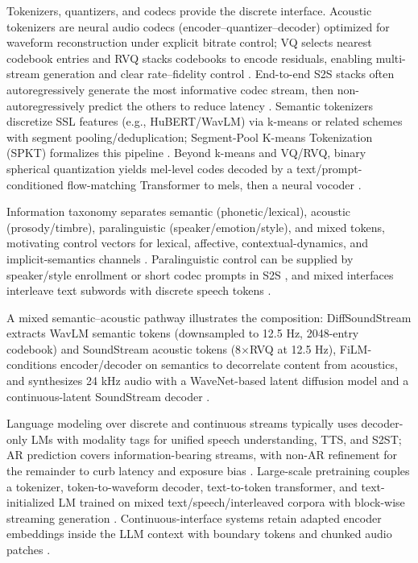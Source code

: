 \documentclass{article}
\begin{document}
Tokenizers, quantizers, and codecs provide the discrete interface. Acoustic tokenizers are neural audio codecs (encoder--quantizer--decoder) optimized for waveform reconstruction under explicit bitrate control; VQ selects nearest codebook entries and RVQ stacks codebooks to encode residuals, enabling multi-stream generation and clear rate--fidelity control \cite{guo2025recentadvancesdiscretespeechtokensreview}. End-to-end S2S stacks often autoregressively generate the most informative codec stream, then non-autoregressively predict the others to reduce latency \cite{peng2024mslms2stmultitaskspeechlanguagemodeltext}. Semantic tokenizers discretize SSL features (e.g., HuBERT/WavLM) via k-means or related schemes with segment pooling/deduplication; Segment-Pool K-means Tokenization (SPKT) formalizes this pipeline \cite{kando2025exploringeffectsegmentationvocabularysiz}. Beyond k-means and VQ/RVQ, binary spherical quantization yields mel-level codes decoded by a text/prompt-conditioned flow-matching Transformer to mels, then a neural vocoder \cite{wang2025tadicodectextawarediffusionspeechtokeniz}.

Information taxonomy separates semantic (phonetic/lexical), acoustic (prosody/timbre), paralinguistic (speaker/emotion/style), and mixed tokens, motivating control vectors for lexical, affective, contextual-dynamics, and implicit-semantics channels \cite{guo2025recentadvancesdiscretespeechtokensreview,wang2025bossbeyondsemanticspeech}. Paralinguistic control can be supplied by speaker/style enrollment or short codec prompts in S2S \cite{wu2024speechcomposerunifyingmultiplespeechtask,peng2024mslms2stmultitaskspeechlanguagemodeltext}, and mixed interfaces interleave text subwords with discrete speech tokens \cite{wu2024speechcomposerunifyingmultiplespeechtask}.

A mixed semantic--acoustic pathway illustrates the composition: DiffSoundStream extracts WavLM semantic tokens (downsampled to 12.5 Hz, 2048-entry codebook) and SoundStream acoustic tokens (8$\times$RVQ at 12.5 Hz), FiLM-conditions encoder/decoder on semantics to decorrelate content from acoustics, and synthesizes 24 kHz audio with a WaveNet-based latent diffusion model and a continuous-latent SoundStream decoder \cite{yang2025diffsoundstreamefficientspeechtokenizati}.

Language modeling over discrete and continuous streams typically uses decoder-only LMs with modality tags for unified speech understanding, TTS, and S2ST; AR prediction covers information-bearing streams, with non-AR refinement for the remainder to curb latency and exposure bias \cite{wu2024speechcomposerunifyingmultiplespeechtask,peng2024mslms2stmultitaskspeechlanguagemodeltext}. Large-scale pretraining couples a tokenizer, token-to-waveform decoder, text-to-token transformer, and text-initialized LM trained on mixed text/speech/interleaved corpora with block-wise streaming generation \cite{zeng2024scalingspeechtextpretrainingsyntheticint}. Continuous-interface systems retain adapted encoder embeddings inside the LLM context with boundary tokens and chunked audio patches \cite{nguyen2025qwenvsgemmaintegrationwhispercomparative,shu2023llasmlargelanguagespeechmodel}.
\end{document}
